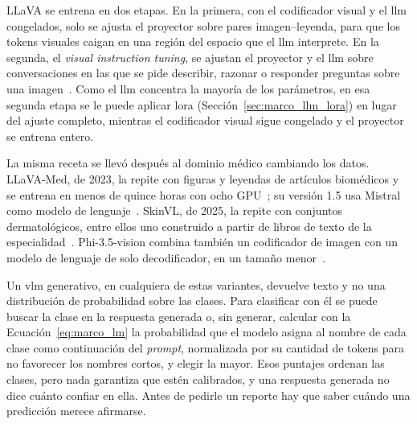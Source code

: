 LLaVA se entrena en dos etapas. En la primera, con el codificador visual y el \gls{llm} congelados, solo se
ajusta el proyector sobre pares imagen--leyenda, para que los tokens visuales caigan en una región del
espacio que el \gls{llm} interprete. En la segunda, el \emph{visual instruction tuning}, se ajustan el
proyector y el \gls{llm} sobre conversaciones en las que se pide describir, razonar o responder preguntas
sobre una imagen~\cite{liu2023visual}. Como el \gls{llm} concentra la mayoría de los parámetros, en esa
segunda etapa se le puede aplicar \gls{lora} (Sección~\ref{sec:marco_llm_lora}) en lugar del ajuste completo,
mientras el codificador visual sigue congelado y el proyector se entrena entero.



La misma receta se llevó después al dominio médico cambiando los datos. LLaVA-Med, de 2023, la repite con
figuras y leyendas de artículos biomédicos y se entrena en menos de quince horas con ocho
GPU~\cite{li2023llavamed}; su versión 1.5 usa Mistral como modelo de lenguaje~\cite{zeng2025mmskin}. SkinVL, de 2025, la repite con
conjuntos dermatológicos, entre ellos uno construido a partir de libros de texto de la
especialidad~\cite{zeng2025mmskin}. Phi-3.5-vision combina también un codificador de imagen con un modelo de
lenguaje de solo decodificador, en un tamaño menor~\cite{abdin2024phi3}.

Un \gls{vlm} generativo, en cualquiera de estas variantes, devuelve texto y no una distribución de probabilidad
sobre las clases. Para clasificar con él se puede buscar la clase en la respuesta generada o, sin generar,
calcular con la Ecuación~\ref{eq:marco_lm} la probabilidad que el modelo asigna al nombre de cada clase como
continuación del \emph{prompt}, normalizada por su cantidad de tokens para no favorecer los nombres cortos, y
elegir la mayor. Esos puntajes ordenan las clases, pero nada garantiza que estén
calibrados, y una respuesta generada no dice cuánto confiar en ella. Antes de pedirle un reporte hay que saber
cuándo una predicción merece afirmarse.

